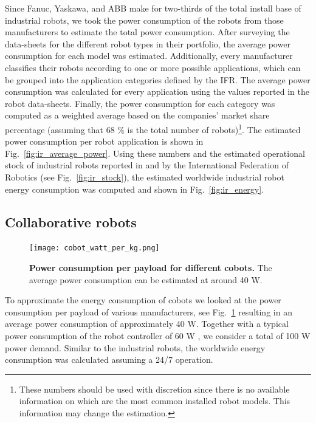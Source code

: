 Since Fanuc, Yaskawa, and ABB make for two-thirds of the total install base of industrial robots, we took the power consumption of the robots from those manufacturers to estimate the total power consumption. After surveying the data-sheets for the different robot types in their portfolio, the average power consumption for each model was estimated. Additionally, every manufacturer classifies their robots according to one or more possible applications, which can be grouped into the application categories defined by the IFR. The average power consumption was calculated for every application using the values reported in the robot data-sheets. Finally, the power consumption for each category was computed as a weighted average based on the companies' market share percentage (assuming that 68 \% is the total number of robots)\footnote[1]{These numbers should be used with discretion since there is no available information on which are the most common installed robot models. This information may change the estimation.}. The estimated power consumption per robot application is shown in Fig.~\ref{fig:ir_average_power}. Using these numbers and the estimated operational stock of industrial robots reported in \cite{statista_ir_operational_stock} and by the International Federation of Robotics (see Fig.~\ref{fig:ir_stock}), the estimated worldwide industrial robot energy consumption was computed and shown in Fig.~\ref{fig:ir_energy}.

\subsection{Collaborative robots}\label{sec:app_cobot_ener_consumption}
\begin{figure}[!h]
	\centering
	\texttt{[image: cobot\_watt\_per\_kg.png]}
	\caption{\textbf{Power consumption per payload for different cobots.} The average power consumption can be estimated at around 40 W.}
	\label{fig:cobot_watt_per_kg}
\end{figure}
To approximate the energy consumption of cobots we looked at the power consumption per payload of various manufacturers, see Fig.~\ref{fig:cobot_watt_per_kg} resulting in an average power consumption of approximately 40 W. Together with a typical power consumption of the robot controller of 60 W \cite{Heredia2023BreakingEnergyConsumption}, we consider a total of 100 W power demand. Similar to the industrial robots, the worldwide energy consumption was calculated assuming a 24/7 operation.



